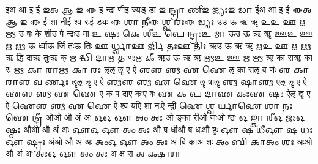 \documentclass{article}
\begin{document}
\card
{इ}{अ आ इ ई}%
{𑌇}{𑌅 𑌆 𑌇 𑌈}
{{इ न्द्रा णी}{इ ज्यः}{इ डा}}%
{{𑌇 𑌨𑍍𑌦𑍍𑌰𑌾 𑌣𑍀}{𑌇 𑌜𑍍𑌯𑌃}{𑌇 𑌡𑌾}}
\card
{ई}{अ आ इ ई}%
{𑌈}{𑌅 𑌆 𑌇 𑌈}
{{ई शा नी}{ई श्व रः}{ई ड्यः}}%
{{𑌈 𑌶𑌾 𑌨𑍀}{𑌈 𑌶𑍍𑌵 𑌰𑌃}{𑌈 𑌡𑍍𑌯𑌃}}
\card
{उ}{उ ऊ ऋ ॠ}%
{𑌉}{𑌉 𑌊 𑌋 𑍠}
{{उ षः के शी}{उ पे न्द्रः}{उ मा}}%
{{𑌉 𑌷𑌃 𑌕𑍇 𑌶𑍀}{𑌉 𑌪𑍇 𑌨𑍍𑌦𑍍𑌰𑌃}{𑌉 𑌮𑌾}}
\card
{ऊ}{उ ऊ ऋ ॠ}%
{𑌊}{𑌉 𑌊 𑌋 𑍠}
{{ऊ र्ध्वा}{ऊ र्जि तः}{ऊ तिः}}%
{{𑌊 𑌰𑍍𑌧𑍍𑌵𑌾}{𑌊 𑌰𑍍𑌜𑌿 𑌤𑌃}{𑌊 𑌤𑌿𑌃}}
\card
{ऋ}{उ ऊ ऋ ॠ}%
{𑌋}{𑌉 𑌊 𑌋 𑍠}
{{ऋ द्धि दा}{ऋ तुः}{ऋ क्}}%
{{𑌋 𑌦𑍍𑌧𑌿 𑌦𑌾}{𑌋 𑌤𑍁𑌃}{𑌋 𑌕𑍍}}
\card
{ॠ}{उ ऊ ऋ ॠ}%
{𑍠}{𑌉 𑌊 𑌋 𑍠}
{{ॠ का रा}{ॠ का रः}{ }}%
{{𑍠 𑌕𑌾 𑌰𑌾}{𑍠 𑌕𑌾 𑌰𑌃}{ }}
\card
{ऌ}{ऌ ॡ ए ऐ}%
{𑌌}{𑌌 𑍡 𑌏 𑌐}
{{ऌ का रा}{ऌ व र्णः}{ }}%
{{𑌌 𑌕𑌾 𑌰𑌾}{𑌌 𑌵 𑌰𑍍𑌣𑌃}{ }}
\card
{ॡ}{ऌ ॡ ए ऐ}%
{𑍡}{𑌌 𑍡 𑌏 𑌐}
{{ॡ षा}{ॡ}{ }}%
{{𑍡 𑌷𑌾}{𑍡}{ }}
\card
{ए}{ऌ ॡ ए ऐ}%
{𑌏}{𑌌 𑍡 𑌏 𑌐}
{{ए क प दा}{ए कः}{ए षः}}%
{{𑌏 𑌕 𑌪 𑌦𑌾}{𑌏 𑌕𑌃}{𑌏 𑌷𑌃}}
\card
{ऐ}{ऌ ॡ ए ऐ}%
{𑌐}{𑌌 𑍡 𑌏 𑌐}
{{ऐ श्व र्या}{ऐ शा नः}{ऐ न्द्री}}%
{{𑌐 𑌶𑍍𑌵 𑌰𑍍𑌯𑌾}{𑌐 𑌶𑌾 𑌨𑌃}{𑌐 𑌨𑍍𑌦𑍍𑌰𑍀}}
\card
{ओ}{ओ औ अं अः}%
{𑌓}{𑌓 𑌔 𑌅𑌂 𑌅𑌃}
{{ओ ङ्का री}{ओ जः}{ओ ष्ठः}}%
{{𑌓 𑌙𑍍𑌕𑌾 𑌰𑍀}{𑌓 𑌜𑌃}{𑌓 𑌷𑍍𑌠𑌃}}
\card
{औ}{ओ औ अं अः}%
{𑌔}{𑌓 𑌔 𑌅𑌂 𑌅𑌃}
{{औ ष धी}{औ ष धः}{औ ष्ट्रः}}%
{{𑌔 𑌷 𑌧𑍀}{𑌔 𑌷 𑌧𑌃}{𑌔 𑌷𑍍𑌟𑍍𑌰𑌃}}
\card
{अं}{ओ औ अं अः}%
{𑌅𑌂}{𑌓 𑌔 𑌅𑌂 𑌅𑌃}
{{अं बि का}{अं शः}{ }}%
{{𑌅𑌂 𑌬𑌿 𑌕𑌾}{𑌅𑌂 𑌶𑌃}{ }}
\card
{अः}{ओ औ अं अः}%
{𑌅𑌃}{𑌓 𑌔 𑌅𑌂 𑌅𑌃}
{{अ क्ष रा}{ }{ }}%
{{𑌅 𑌕𑍍𑌷 𑌰𑌾}{ }{ }}
\end{document}
